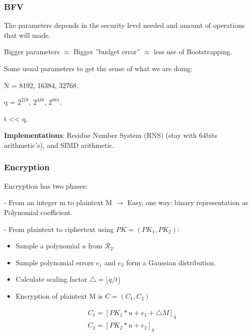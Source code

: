 \documentclass[10pt,handout]{beamer}
\begin{document}


\begin{frame}
\frametitle{BFV}

The parameters depends in the security level needed and amount of operations that will made.

Bigger parameters $\approx$ Bigger ''budget error'' $\approx$ less use of Bootstrapping.

Some usual parameters to get the sense of what we are doing:

N = 8192, 16384, 32768.

q = $2^{218}$,   $2^{438}$,  $2^{881}$.

t  << q.


    \textbf{Implementations}: Residue Number System (RNS) (stay with 64bits arithmetic's), and SIMD arithmetic.
\end{frame}


\begin{frame}
\frametitle{Encryption}

Encryption has two phases:

 - From an integer m to plaintext M $\rightarrow$ Easy, one way: binary representation as Polynomial coefficient.

    - From plaintext to ciphertext using $PK = (PK_1, PK_2)$:

\begin{itemize}
    \item Sample a polynomial $u$ from $\mathcal{R}_2$.
    \item Sample polynomial errors $e_1$ and $e_2$ form a Gaussian distribution.
    \item Calculate scaling factor $\triangle = \lfloor q/t\rfloor $
    \item Encryption of plaintext M is $C=(C_1, C_2)$
\end{itemize}
\begin{align}
    &C_1 = [PK_1 * u + e_1 + \triangle M ]_q\nonumber \\
    &C_2 = [PK_2 * u + e_2]_q\nonumber
\end{align}


\end{frame}
\end{document}
